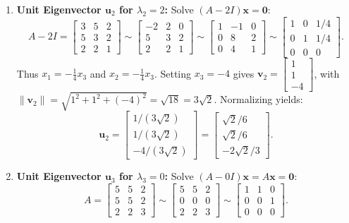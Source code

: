 \documentclass[11pt, letterpaper]{article}
\theoremstyle{definition}
\theoremstyle{remark}
\begin{document}
\begin{enumerate}[leftmargin=2em]
\[    \]
    \item \textbf{Unit Eigenvector $\mathbf{u}_2$ for $\lambda_2 = 2$:}
    Solve $(A - 2I)\mathbf{x} = \mathbf{0}$:
    \[
    A - 2I = \begin{bmatrix} 3 & 5 & 2 \\ 5 & 3 & 2 \\ 2 & 2 & 1 \end{bmatrix} \sim \begin{bmatrix} -2 & 2 & 0 \\ 5 & 3 & 2 \\ 2 & 2 & 1 \end{bmatrix} \sim \begin{bmatrix} 1 & -1 & 0 \\ 0 & 8 & 2 \\ 0 & 4 & 1 \end{bmatrix} \sim \begin{bmatrix} 1 & 0 & 1/4 \\ 0 & 1 & 1/4 \\ 0 & 0 & 0 \end{bmatrix}.
    \]
    Thus $x_1 = -\frac{1}{4}x_3$ and $x_2 = -\frac{1}{4}x_3$. Setting $x_3 = -4$ gives $\mathbf{v}_2 = \begin{bmatrix} 1 \\ 1 \\ -4 \end{bmatrix}$, with $\|\mathbf{v}_2\| = \sqrt{1^2 + 1^2 + (-4)^2} = \sqrt{18} = 3\sqrt{2}$. Normalizing yields:
    \[
    \mathbf{u}_2 = \begin{bmatrix} 1/(3\sqrt{2}) \\ 1/(3\sqrt{2}) \\ -4/(3\sqrt{2}) \end{bmatrix} = \begin{bmatrix} \sqrt{2}/6 \\ \sqrt{2}/6 \\ -2\sqrt{2}/3 \end{bmatrix}.
    \]
    \item \textbf{Unit Eigenvector $\mathbf{u}_3$ for $\lambda_3 = 0$:}
    Solve $(A - 0I)\mathbf{x} = A\mathbf{x} = \mathbf{0}$:
    \[
    A = \begin{bmatrix} 5 & 5 & 2 \\ 5 & 5 & 2 \\ 2 & 2 & 3 \end{bmatrix} \sim \begin{bmatrix} 5 & 5 & 2 \\ 0 & 0 & 0 \\ 2 & 2 & 3 \end{bmatrix} \sim \begin{bmatrix} 1 & 1 & 0 \\ 0 & 0 & 1 \\ 0 & 0 & 0 \end{bmatrix}.
\]
\end{enumerate}
\end{document}
